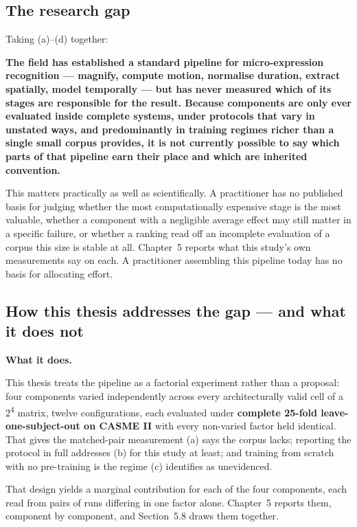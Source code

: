 \subsection{The research gap}
\label{sec:research-gap}

Taking (a)--(d) together:

\textbf{The field has established a standard pipeline for micro-expression recognition --- magnify, compute motion, normalise duration, extract spatially, model temporally --- but has never measured which of its stages are responsible for the result. Because components are only ever evaluated inside complete systems, under protocols that vary in unstated ways, and predominantly in training regimes richer than a single small corpus provides, it is not currently possible to say which parts of that pipeline earn their place and which are inherited convention.}

This matters practically as well as scientifically. A practitioner has no published basis for judging whether the most computationally expensive stage is the most valuable, whether a component with a negligible average effect may still matter in a specific failure, or whether a ranking read off an incomplete evaluation of a corpus this size is stable at all. Chapter~5 reports what this study's own measurements say on each. A practitioner assembling this pipeline today has no basis for allocating effort.

\subsection{How this thesis addresses the gap --- and what it does not}
\label{sec:addressing-gap}

\textbf{What it does.}

This thesis treats the pipeline as a factorial experiment rather than a proposal: four components varied independently across every architecturally valid cell of a 2\textsuperscript{4} matrix, twelve configurations, each evaluated under \textbf{complete 25-fold leave-one-subject-out on CASME II} with every non-varied factor held identical. That gives the matched-pair measurement (a) says the corpus lacks; reporting the protocol in full addresses (b) for this study at least; and training from scratch with no pre-training is the regime (c) identifies as unevidenced.

That design yields a marginal contribution for each of the four components, each read from pairs of runs differing in one factor alone. Chapter~5 reports them, component by component, and Section~5.8 draws them together.


